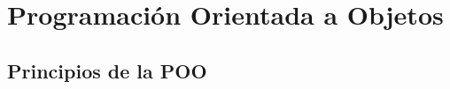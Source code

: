 \documentclass[10pt,envcountsect,spanish]{beamer}
\begin{document}







\section{Programación Orientada a Objetos}



\subsection{Principios de la POO}
\end{document}
